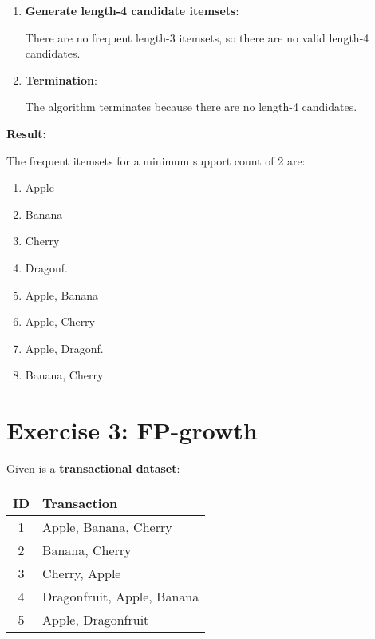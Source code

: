 \documentclass[
english,
smallborders
]{i6prcsht}
\begin{document}
\begin{solution}
\begin{enumerate}
		\item \textbf{Generate length-4 candidate itemsets}:

		      There are no frequent length-3 itemsets, so there are no valid length-4 candidates.

		\item \textbf{Termination}:

		      The algorithm terminates because there are no length-4 candidates.

	\end{enumerate}

	\textbf{Result:}

	\vspace*{-0.2cm}

	The frequent itemsets for a minimum support count of 2 are:

	\begin{multicols}{4}
		\begin{enumerate}
			\item Apple
			\item Banana
			\item Cherry
			\item Dragonf.
			\item Apple, Banana
			\item Apple, Cherry
			\item Apple, Dragonf.
			\item Banana, Cherry
		\end{enumerate}
	\end{multicols}
\end{solution}

\section*{Exercise 3: FP-growth}

Given is a \textbf{transactional dataset}:

\begin{center}
	\begin{tabular}{|c|l|}
		\hline
		\textbf{ID} & \textbf{Transaction}       \\
		\hline
		1           & Apple, Banana, Cherry      \\
		\hline
		2           & Banana, Cherry             \\
		\hline
		3           & Cherry, Apple              \\
		\hline
		4           & Dragonfruit, Apple, Banana \\
		\hline
		5           & Apple, Dragonfruit         \\
		\hline
	\end{tabular}
\end{center}
\end{document}
